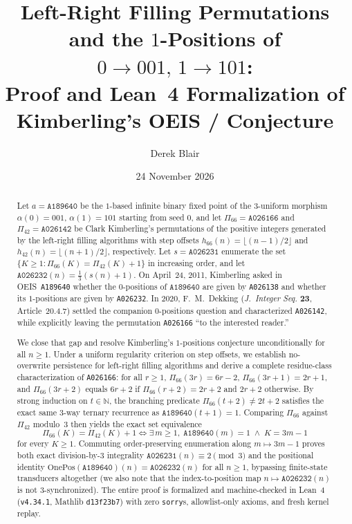 \documentclass[11pt]{article}
\title{Left-Right Filling Permutations and the $1$-Positions of $0 \to 001,\, 1 \to 101$:\\[2pt]
\large Proof and Lean~4 Formalization of Kimberling's OEIS \seq{A189640}/\seq{A026232} Conjecture}
\author{Derek Blair}
\date{24 November 2026}
\theoremstyle{definition}
\newcommand{\N}{\mathbb{N}}
\newcommand{\seq}[1]{\texttt{#1}}
\newcommand{\OnePos}{\mathrm{OnePos}}
\begin{document}
\maketitle

\begin{abstract}
Let $a = \seq{A189640}$ be the $1$-based infinite binary fixed point of the $3$-uniform morphism $\alpha(0) = 001$, $\alpha(1) = 101$ starting from seed $0$, and let $\Pi_{66} = \seq{A026166}$ and $\Pi_{42} = \seq{A026142}$ be Clark Kimberling's permutations of the positive integers generated by the left-right filling algorithms with step offsets $h_{66}(n) = \lfloor (n-1)/2 \rfloor$ and $h_{42}(n) = \lfloor (n+1)/2 \rfloor$, respectively. Let $s = \seq{A026231}$ enumerate the set $\{K \ge 1 : \Pi_{66}(K) = \Pi_{42}(K) + 1\}$ in increasing order, and let $\seq{A026232}(n) = \frac{1}{3}(s(n) + 1)$. On April~24, 2011, Kimberling asked in OEIS~\seq{A189640} whether the $0$-positions of $\seq{A189640}$ are given by \seq{A026138} and whether its $1$-positions are given by \seq{A026232}. In 2020, F.~M.\ Dekking (\emph{J.\ Integer Seq.} \textbf{23}, Article~20.4.7) settled the companion $0$-positions question and characterized \seq{A026142}, while explicitly leaving the permutation \seq{A026166} ``to the interested reader.''

We close that gap and resolve Kimberling's $1$-positions conjecture unconditionally for all $n \ge 1$. Under a uniform regularity criterion on step offsets, we establish no-overwrite persistence for left-right filling algorithms and derive a complete residue-class characterization of \seq{A026166}: for all $r \ge 1$, $\Pi_{66}(3r) = 6r - 2$, $\Pi_{66}(3r + 1) = 2r + 1$, and $\Pi_{66}(3r + 2)$ equals $6r + 2$ if $\Pi_{66}(r + 2) = 2r + 2$ and $2r + 2$ otherwise. By strong induction on $t \in \N$, the branching predicate $\Pi_{66}(t + 2) \ne 2t + 2$ satisfies the exact same $3$-way ternary recurrence as $\seq{A189640}(t + 1) = 1$. Comparing $\Pi_{66}$ against $\Pi_{42}$ modulo~$3$ then yields the exact set equivalence
\[
\Pi_{66}(K) = \Pi_{42}(K) + 1 \iff \exists\, m \ge 1,\; \seq{A189640}(m) = 1 \;\wedge\; K = 3m - 1
\]
for every $K \ge 1$. Commuting order-preserving enumeration along $m \mapsto 3m - 1$ proves both exact division-by-$3$ integrality $\seq{A026231}(n) \equiv 2 \pmod{3}$ and the positional identity $\OnePos(\seq{A189640})(n) = \seq{A026232}(n)$ for all $n \ge 1$, bypassing finite-state transducers altogether (we also note that the index-to-position map $n \mapsto \seq{A026232}(n)$ is not $3$-synchronized). The entire proof is formalized and machine-checked in Lean~4 (\texttt{v4.34.1}, Mathlib \texttt{d13f23b7}) with zero \texttt{sorry}s, allowlist-only axioms, and fresh kernel replay.
\end{abstract}
\end{document}

